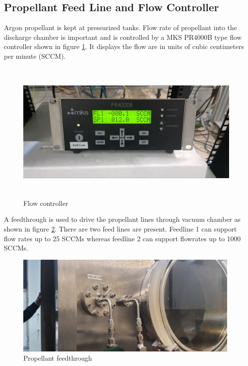 \subsection{Propellant Feed Line and Flow Controller}
Argon propellant is kept at pressurized tanks. Flow rate of propellant into the discharge chamber is important and is controlled by a MKS PR4000B type flow controller shown in figure \ref{fig:flowcont}. It displays the flow are in units of cubic centimeters per minute (SCCM). 

\begin{figure}[ht]
    \centering
    \includegraphics[height=7cm]{fig/flowcontroller.jpeg}
    \caption{Flow controller}
    \label{fig:flowcont}
\end{figure}

A feedthrough is used to drive the propellant lines through vacuum chamber as shown in figure \ref{fig:propfeedthr}. There are two feed lines are present. Feedline 1 can support flow rates up to 25 SCCMs whereas feedline 2 can support flowrates up to 1000 SCCMs.

\begin{figure}[ht]
    \centering
    \includegraphics[height=5cm]{fig/propfeedthr.jpeg}
    \caption{Propellant feedthrough}
    \label{fig:propfeedthr}
\end{figure}



